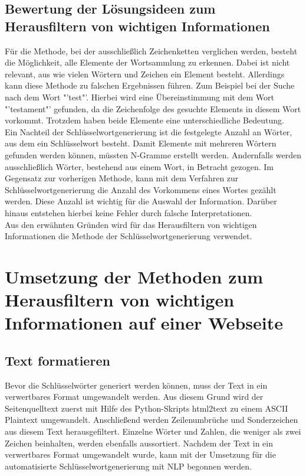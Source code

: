	\subsection{Bewertung der Lösungsideen zum Herausfiltern von wichtigen Informationen}
	Für die Methode, bei der ausschließlich Zeichenketten verglichen werden, besteht die Möglichkeit, alle Elemente der Wortsammlung zu erkennen. Dabei ist nicht relevant, aus wie vielen Wörtern und Zeichen ein Element besteht. Allerdings kann diese Methode zu falschen Ergebnissen führen. Zum Beispiel bei der Suche nach dem Wort "'test"'. Hierbei wird eine Übereinstimmung mit dem Wort "'testament"' gefunden, da die Zeichenfolge des gesuchte Elements in diesem Wort vorkommt. Trotzdem haben beide Elemente eine unterschiedliche Bedeutung. \\
	Ein Nachteil der Schlüsselwortgenerierung ist die festgelegte Anzahl an Wörter, aus dem ein Schlüsselwort besteht. Damit Elemente mit mehreren Wörtern gefunden werden können, müssten N-Gramme erstellt werden. Andernfalls werden ausschließlich Wörter, bestehend aus einem Wort, in Betracht gezogen. Im Gegensatz zur vorherigen Methode, kann mit dem Verfahren zur Schlüsselwortgenerierung die Anzahl des Vorkommens eines Wortes gezählt werden. Diese Anzahl ist wichtig für die Auswahl der Information. Darüber hinaus entstehen hierbei keine Fehler durch falsche Interpretationen.\\
	Aus den erwähnten Gründen wird für das Herausfiltern von wichtigen Informationen die Methode der Schlüsselwortgenerierung verwendet.


\section{Umsetzung der Methoden zum Herausfiltern von wichtigen Informationen auf einer Webseite}
	\subsection{Text formatieren}
	\label{subsec:TextFormatieren}
	Bevor die Schlüsselwörter generiert werden können, muss der Text in ein verwertbares Format umgewandelt werden. Aus diesem Grund wird der Seitenquelltext zuerst mit Hilfe des Python-Skripts html2text zu einem ASCII Plaintext umgewandelt.\cite{html2text} Anschließend werden Zeilenumbrüche und Sonderzeichen aus diesem Text herausgefiltert. Einzelne Wörter und Zahlen, die weniger als zwei Zeichen beinhalten, werden ebenfalls aussortiert. Nachdem der Text in ein verwertbares Format umgewandelt wurde, kann mit der Umsetzung für die automatisierte Schlüsselwortgenerierung mit NLP begonnen werden.
	
